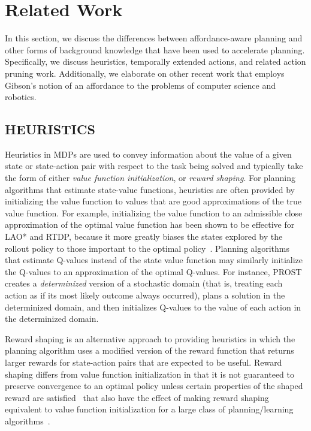 \documentclass[]{article}
\begin{document}
\section{Related Work}
In this section, we discuss the differences between
affordance-aware planning and other forms of background knowledge that
have been used to accelerate planning.  Specifically, we discuss
heuristics, temporally extended actions, and related action pruning
work.  Additionally, we elaborate on other recent work that
employs Gibson's notion of an affordance to the problems of computer
science and robotics.


\subsection{HEURISTICS}
Heuristics in MDPs are used to convey information about the value of a given state or state-action pair with respect to the task being solved and typically take the form of either {\em value function initialization},
or {\em reward shaping}. For planning algorithms that estimate state-value functions, heuristics are often
provided by initializing the value function to values that are good approximations of the true value function. For example, initializing the value function to an admissible close approximation of the optimal value function has been shown to be effective for LAO* and RTDP, because it more greatly biases the states explored by the rollout policy to those important to the optimal policy~\citep{Hansen:1999qf}. Planning algorithms that estimate Q-values instead of the state value function may similarly initialize the Q-values to an approximation of the optimal Q-values. For instance, PROST~\citep{keller2012prost} creates a {\em determinized} version of a stochastic domain (that is, treating each action as if its most likely outcome always occurred), plans a solution in the determinized domain, and then initializes Q-values to the value of each action in the determinized domain.

Reward shaping is an alternative approach to providing heuristics in which the planning algorithm uses a modified version of the reward function that returns larger rewards for state-action pairs that are expected to be useful. Reward shaping differs from value function initialization in that it is not guaranteed to preserve convergence to an optimal policy unless certain properties of the shaped reward are satisfied~\citep{potshap} that also have the effect of making reward shaping equivalent to value function initialization for a large class of planning/learning algorithms~\citep{Wiewiora:2003fk}.
\end{document}
